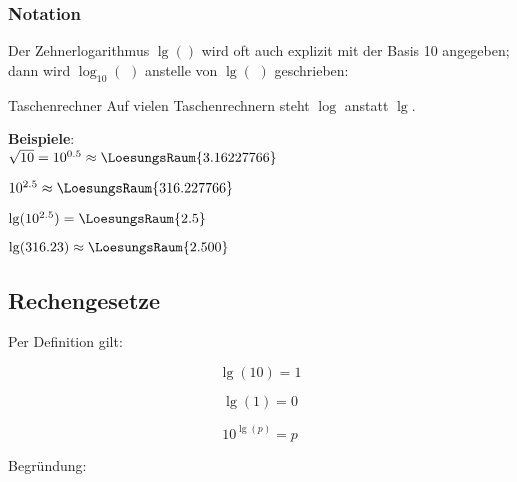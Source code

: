 \subsubsection{Notation}
Der Zehnerlogarithmus $\lg()$ wird oft auch explizit mit der Basis 10
angegeben; dann wird $\log_{10}(\,\,)$ anstelle von $\lg(\,\,)$ geschrieben:

\begin{center}
\end{center}

\begin{bemerkung}{Taschenrechner}{}
  Auf vielen Taschenrechnern steht $\log$ anstatt $\lg$.

  \end{bemerkung}


\textbf{Beispiele}:\\


$\sqrt{10} = 10^{0.5} \approx \LoesungsRaum{3.16227766}$
\leserluft{}

$10^{2.5} \approx \LoesungsRaum{316.227766}$\\
\leserluft{}

$\lg(10^{2.5}) = \LoesungsRaum{2.5}$

\leserluft{}

$\lg(316.23) \approx \LoesungsRaum{2.500}$



\newpage

\subsection{Rechengesetze}
Per Definition gilt:

\begin{gesetz}{}{}
$$\lg(10) = 1$$
\end{gesetz}

\begin{gesetz}{}{}
$$\lg(1) = 0$$
\end{gesetz}

\begin{gesetz}{}{}
  $$10^{\lg(p)} = p$$
\end{gesetz}

Begründung:

